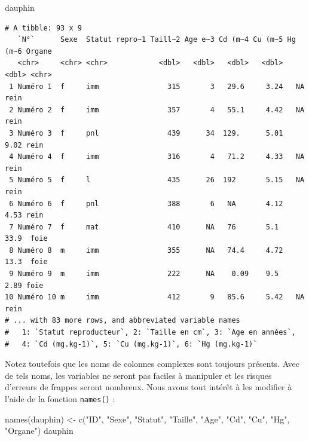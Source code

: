 \documentclass[
  letterpaper,
  DIV=11,
  numbers=noendperiod]{scrreprt}
\newenvironment{Shaded}{\begin{snugshade}}{\end{snugshade}}
\newcommand{\FunctionTok}[1]{\textcolor[rgb]{0.28,0.35,0.67}{#1}}
\newcommand{\NormalTok}[1]{\textcolor[rgb]{0.00,0.23,0.31}{#1}}
\newcommand{\OtherTok}[1]{\textcolor[rgb]{0.00,0.23,0.31}{#1}}
\newcommand{\StringTok}[1]{\textcolor[rgb]{0.13,0.47,0.30}{#1}}
\begin{document}
\begin{Shaded}
\begin{Highlighting}[]
\NormalTok{dauphin}
\end{Highlighting}
\end{Shaded}

\begin{verbatim}
# A tibble: 93 x 9
   `N°`      Sexe  Statut repro~1 Taill~2 Age e~3 Cd (m~4 Cu (m~5 Hg (m~6 Organe
   <chr>     <chr> <chr>            <dbl>   <dbl>   <dbl>   <dbl>   <dbl> <chr> 
 1 Numéro 1  f     imm                315       3   29.6     3.24   NA    rein  
 2 Numéro 2  f     imm                357       4   55.1     4.42   NA    rein  
 3 Numéro 3  f     pnl                439      34  129.      5.01    9.02 rein  
 4 Numéro 4  f     imm                316       4   71.2     4.33   NA    rein  
 5 Numéro 5  f     l                  435      26  192       5.15   NA    rein  
 6 Numéro 6  f     pnl                388       6   NA       4.12    4.53 rein  
 7 Numéro 7  f     mat                410      NA   76       5.1    33.9  foie  
 8 Numéro 8  m     imm                355      NA   74.4     4.72   13.3  foie  
 9 Numéro 9  m     imm                222      NA    0.09    9.5     2.89 foie  
10 Numéro 10 m     imm                412       9   85.6     5.42   NA    rein  
# ... with 83 more rows, and abbreviated variable names
#   1: `Statut reproducteur`, 2: `Taille en cm`, 3: `Age en années`,
#   4: `Cd (mg.kg-1)`, 5: `Cu (mg.kg-1)`, 6: `Hg (mg.kg-1)`
\end{verbatim}

Notez toutefois que les noms de colonnes complexes sont toujours
présents. Avec de tels noms, les variables ne seront pas faciles à
manipuler et les risques d'erreurs de frappes seront nombreux. Nous
avons tout intérêt à les modifier à l'aide de la fonction
\texttt{names()} :

\begin{Shaded}
\begin{Highlighting}[]
\FunctionTok{names}\NormalTok{(dauphin) }\OtherTok{\textless{}{-}} \FunctionTok{c}\NormalTok{(}\StringTok{"ID"}\NormalTok{, }\StringTok{"Sexe"}\NormalTok{, }\StringTok{"Statut"}\NormalTok{, }\StringTok{"Taille"}\NormalTok{,}
                    \StringTok{"Age"}\NormalTok{, }\StringTok{"Cd"}\NormalTok{, }\StringTok{"Cu"}\NormalTok{, }\StringTok{"Hg"}\NormalTok{, }\StringTok{"Organe"}\NormalTok{)}
\NormalTok{dauphin}
\end{Highlighting}
\end{Shaded}
\end{document}
